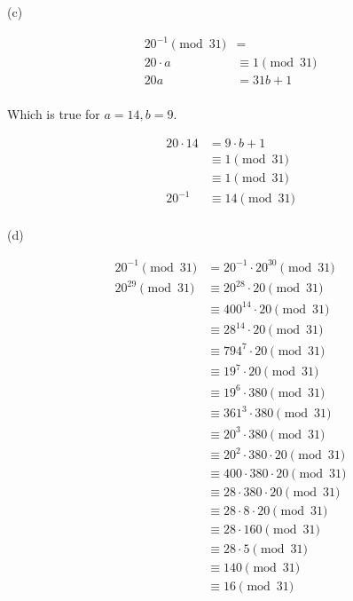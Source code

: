 \begin{solution}
(c)

\begin{align*}
20^{-1} \pmod{31} &= \\
20 \cdot a &\equiv 1 \pmod{31}\\
20a &= 31b + 1\\
\end{align*}



Which is true for $a = 14, b = 9$.

\begin{align*}
20 \cdot 14 &= 9 \cdot b + 1 \\
&\equiv 1 \pmod{31} \\
&\equiv 1 \pmod{31} \\
20^{-1} &\equiv 14 \pmod{31} \\
\end{align*}

(d)

\begin{align*}
20^{-1} \pmod{31} &= 20^{-1} \cdot 20^{30} \pmod{31} \\
20^{29} \pmod{31} &\equiv 20^{28} \cdot 20 \pmod{31} \\
&\equiv 400^{14} \cdot 20 \pmod{31} \\
&\equiv 28^{14} \cdot 20 \pmod{31} \\
&\equiv 794^{7} \cdot 20 \pmod{31} \\
&\equiv 19^{7} \cdot 20 \pmod{31} \\
&\equiv 19^{6} \cdot 380 \pmod{31} \\
&\equiv 361^{3} \cdot 380 \pmod{31} \\
&\equiv 20^{3} \cdot 380 \pmod{31} \\
&\equiv 20^{2} \cdot 380 \cdot 20 \pmod{31} \\
&\equiv 400 \cdot 380 \cdot 20 \pmod{31} \\
&\equiv 28 \cdot 380 \cdot 20 \pmod{31} \\
&\equiv 28 \cdot 8 \cdot 20 \pmod{31} \\
&\equiv 28 \cdot 160 \pmod{31} \\
&\equiv 28 \cdot 5 \pmod{31} \\
&\equiv 140 \pmod{31} \\
&\equiv 16 \pmod{31} \\
\end{align*}

\end{solution}
